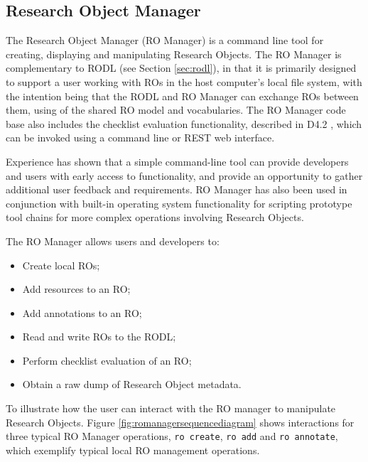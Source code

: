 \subsection{Research Object Manager}
\label{sec:romanager}


The Research Object Manager (RO Manager) is a command line tool for creating, displaying and manipulating Research Objects. The RO Manager is complementary to RODL (see Section \ref{sec:rodl}), in that it is primarily designed to support a user working with ROs in the host computer's local file system, with the intention being that the RODL and RO Manager can exchange ROs between them, using of the shared RO model and vocabularies.  The RO Manager code base also includes the checklist evaluation functionality, described in D4.2 \cite{D4.2v2}, which can be invoked using a command line or REST web interface.

Experience has shown that a simple command-line tool can provide developers and users with early access to functionality, and provide an opportunity to gather additional user feedback and requirements.  RO Manager has also been used in conjunction with built-in operating system functionality for scripting prototype tool chains for more complex operations involving Research Objects.

The RO Manager allows users and developers to:

\begin{itemize}

\item Create local ROs;
\item Add resources to an RO;
\item Add annotations to an RO;
\item Read and write ROs to the RODL;
\item Perform checklist evaluation of an RO;
\item Obtain a raw dump of Research Object metadata.
\end{itemize}

To illustrate how the user can interact with the RO manager to manipulate Research Objects. Figure \ref{fig:romanagersequencediagram} shows interactions for three typical RO Manager operations, \texttt{ro create}, \texttt{ro add} and
\texttt{ro annotate}, which exemplify typical local RO management operations.

